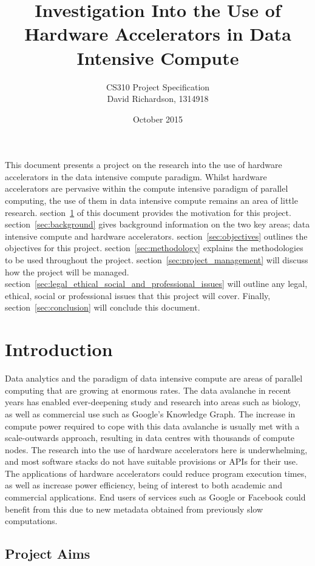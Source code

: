 \documentclass[12pt,a4paper]{article}
\title{Investigation Into the Use of Hardware Accelerators in Data Intensive Compute}
\author{CS310 Project Specification\\David Richardson, 1314918}
\date{October 2015}
\begin{document}
	\maketitle

	This document presents a project on the research into the use of hardware accelerators in the data intensive compute paradigm. Whilst hardware accelerators are pervasive within the compute intensive paradigm of parallel computing, the use of them in data intensive compute remains an area of little research. section~\ref{sec:introduction} of this document provides the motivation for this project. section~\ref{sec:background} gives background information on the two key areas; data intensive compute and hardware accelerators. section~\ref{sec:objectives} outlines the objectives for this project. section~\ref{sec:methodology} explains the methodologies to be used throughout the project. section~\ref{sec:project_management} will discuss how the project will be managed. section~\ref{sec:legal_ethical_social_and_professional_issues} will outline any legal, ethical, social or professional issues that this project will cover. Finally, section~\ref{sec:conclusion} will conclude this document.

	\section{Introduction} %
	\label{sec:introduction}

		Data analytics and the paradigm of data intensive compute are areas of parallel computing that are growing at enormous rates. The data avalanche in recent years has enabled ever-deepening study and research into areas such as biology, as well as commercial use such as Google's Knowledge Graph. The increase in compute power required to cope with this data avalanche is usually met with a scale-outwards approach, resulting in data centres with thousands of compute nodes. The research into the use of hardware accelerators here is underwhelming, and most software stacks do not have suitable provisions or APIs for their use. The applications of hardware accelerators could reduce program execution times, as well as increase power efficiency, being of interest to both academic and commercial applications. End users of services such as Google or Facebook could benefit from this due to new metadata obtained from previously slow computations.

		\subsection{Project Aims} %
		\label{sub:project_aims}
\end{document}
